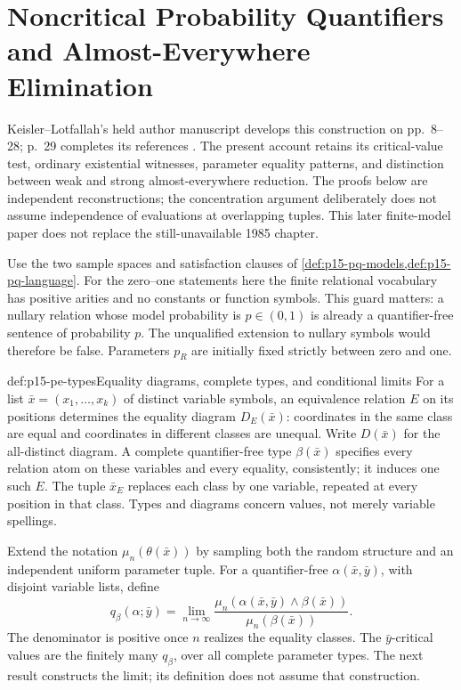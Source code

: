 \chapter{Noncritical Probability Quantifiers and Almost-Everywhere Elimination}
\label{sec:p15-probability-elimination}

Keisler--Lotfallah's held author manuscript develops this construction on
pp.~8--28; p.~29 completes its references
\cite{KeislerLotfallah2009AuthorProbability}. The present account retains
its critical-value test, ordinary existential witnesses, parameter equality
patterns, and distinction between weak and strong almost-everywhere
reduction. The proofs below are independent reconstructions; the
concentration argument deliberately does not assume independence of
evaluations at overlapping tuples. This later finite-model paper does not
replace the still-unavailable 1985 chapter.

Use the two sample spaces and satisfaction clauses of
\cref{def:p15-pq-models,def:p15-pq-language}. For the zero--one statements
here the finite relational vocabulary has positive arities and no
constants or function symbols. This guard matters: a nullary relation
whose model probability is \(p\in(0,1)\) is already a quantifier-free
sentence of probability \(p\). The unqualified extension to nullary
symbols would therefore be false. Parameters \(p_R\) are initially fixed
strictly between zero and one.

\begin{hbdefinition}{def:p15-pe-types}{Equality diagrams, complete types, and conditional limits}
For a list \(\bar x=(x_1,\ldots,x_k)\) of distinct variable symbols, an
equivalence relation \(E\) on its positions determines the equality
diagram \(D_E(\bar x)\): coordinates in the same class are equal and
coordinates in different classes are unequal. Write \(D(\bar x)\) for
the all-distinct diagram. A complete quantifier-free type \(\beta(\bar x)\)
specifies every relation atom on these variables and every equality,
consistently; it induces one such \(E\). The tuple \(\bar x_E\) replaces
each class by one variable, repeated at every position in that class.
Types and diagrams concern values, not merely variable spellings.

Extend the notation \(\mu_n(\theta(\bar x))\) by sampling both the random
structure and an independent uniform parameter tuple. For a
quantifier-free \(\alpha(\bar x,\bar y)\), with disjoint variable lists,
define
\[
 q_\beta(\alpha;\bar y)
   =\lim_{n\to\infty}
       \frac{\mu_n(\alpha(\bar x,\bar y)\land\beta(\bar x))}
            {\mu_n(\beta(\bar x))}.
\]
The denominator is positive once \(n\) realizes the equality classes.
The \(\bar y\)-critical values are the finitely many \(q_\beta\), over
all complete parameter types. The next result constructs the limit;
its definition does not assume that construction.
\end{hbdefinition}

